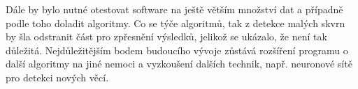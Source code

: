 Dále by bylo nutné otestovat software na ještě větším množství dat a případně podle toho doladit algoritmy. Co se týče algoritmů, tak z detekce malých skvrn by šla odstranit část pro zpřesnění výsledků, jelikož se ukázalo, že není tak důležitá. Nejdůležitějším bodem budoucího vývoje zůstává rozšíření programu o další algoritmy na jiné nemoci a vyzkoušení dalších technik, např. neuronové sítě pro detekci nových věcí.